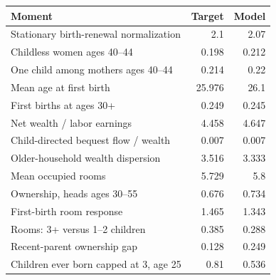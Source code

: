 \begingroup\footnotesize
\setlength{\tabcolsep}{3pt}
\renewcommand{\arraystretch}{1.04}
\begin{tabularx}{\linewidth}{Xrr}
\toprule
Moment & Target & Model \\
\midrule
Stationary birth-renewal normalization & 2.1 & 2.07 \\
Childless women ages 40–44 & 0.198 & 0.212 \\
One child among mothers ages 40–44 & 0.214 & 0.22 \\
Mean age at first birth & 25.976 & 26.1 \\
First births at ages 30+ & 0.249 & 0.245 \\
Net wealth / labor earnings & 4.458 & 4.647 \\
Child-directed bequest flow / wealth & 0.007 & 0.007 \\
Older-household wealth dispersion & 3.516 & 3.333 \\
Mean occupied rooms & 5.729 & 5.8 \\
Ownership, heads ages 30–55 & 0.676 & 0.734 \\
First-birth room response & 1.465 & 1.343 \\
Rooms: 3+ versus 1–2 children & 0.385 & 0.288 \\
Recent-parent ownership gap & 0.128 & 0.249 \\
Children ever born capped at 3, age 25 & 0.81 & 0.536 \\
\bottomrule
\end{tabularx}
\endgroup
